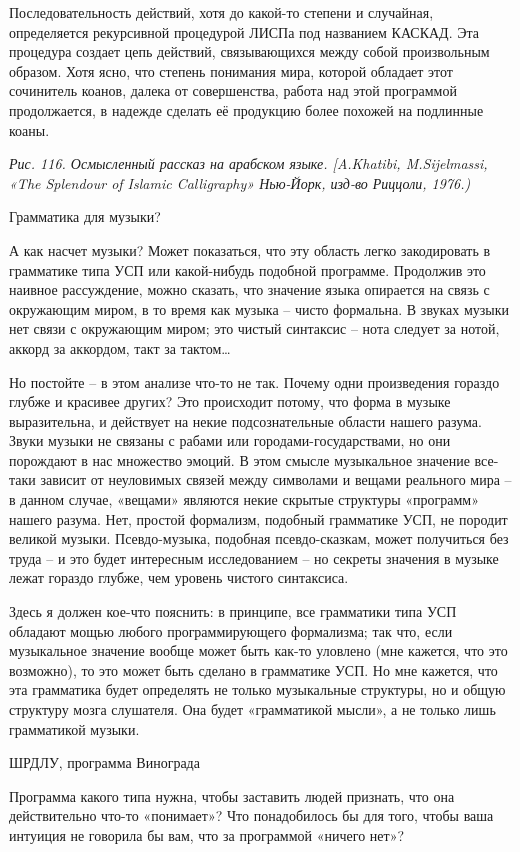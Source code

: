 \documentclass[../main.tex]{subfiles}
\begin{document}
Последовательность действий, хотя до какой-то степени и случайная, определяется рекурсивной процедурой ЛИСПа под названием КАСКАД. Эта процедура создает цепь действий, связывающихся между собой произвольным образом. Хотя ясно, что степень понимания мира, которой обладает этот сочинитель коанов, далека от совершенства, работа над этой программой продолжается, в надежде сделать её продукцию более похожей на подлинные коаны.

\emph{Рис. 116. Осмысленный рассказ на арабском языке. {[}A.Khatibi, M.Sijelmassi, «The Splendour of Islamic Calligraphy» Нью-Йорк, изд-во Риццоли, 1976.)}

Грамматика для музыки?

А как насчет музыки? Может показаться, что эту область легко закодировать в грамматике типа УСП или какой-нибудь подобной программе. Продолжив это наивное рассуждение, можно сказать, что значение языка опирается на связь с окружающим миром, в то время как музыка \--- чисто формальна. В звуках музыки нет связи с окружающим миром; это чистый синтаксис \--- нота следует за нотой, аккорд за аккордом, такт за тактом\ldots{}

Но постойте \--- в этом анализе что-то не так. Почему одни произведения гораздо глубже и красивее других? Это происходит потому, что форма в музыке выразительна, и действует на некие подсознательные области нашего разума. Звуки музыки не связаны с рабами или городами-государствами, но они порождают в нас множество эмоций. В этом смысле музыкальное значение все-таки зависит от неуловимых связей между символами и вещами реального мира \--- в данном случае, «вещами» являются некие скрытые структуры «программ» нашего разума. Нет, простой формализм, подобный грамматике УСП, не породит великой музыки. Псевдо-музыка, подобная псевдо-сказкам, может получиться без труда \--- и это будет интересным исследованием \--- но секреты значения в музыке лежат гораздо глубже, чем уровень чистого синтаксиса.

Здесь я должен кое-что пояснить: в принципе, все грамматики типа УСП обладают мощью любого программирующего формализма; так что, если музыкальное значение вообще может быть как-то уловлено (мне кажется, что это возможно), то это может быть сделано в грамматике УСП. Но мне кажется, что эта грамматика будет определять не только музыкальные структуры, но и общую структуру мозга слушателя. Она будет «грамматикой мысли», а не только лишь грамматикой музыки.

ШРДЛУ, программа Винограда

Программа какого типа нужна, чтобы заставить людей признать, что она действительно что-то «понимает»? Что понадобилось бы для того, чтобы ваша интуиция не говорила бы вам, что за программой «ничего нет»?
\end{document}
